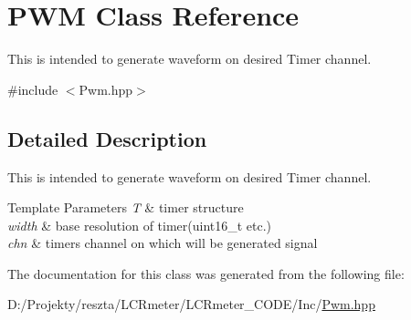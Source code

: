 \hypertarget{class_p_w_m}{}\section{P\+WM Class Reference}
\label{class_p_w_m}


This is intended to generate waveform on desired Timer channel.  




{\ttfamily \#include $<$Pwm.\+hpp$>$}



\subsection{Detailed Description}
This is intended to generate waveform on desired Timer channel. 


\begin{DoxyTemplParams}{Template Parameters}
{\em T} & timer structure \\
\hline
{\em width} & base resolution of timer(uint16\+\_\+t etc.) \\
\hline
{\em chn} & timer\textquotesingle{}s channel on which will be generated signal \\
\hline
\end{DoxyTemplParams}


The documentation for this class was generated from the following file\+:\begin{DoxyCompactItemize}
\item 
D\+:/\+Projekty/reszta/\+L\+C\+Rmeter/\+L\+C\+Rmeter\+\_\+\+C\+O\+D\+E/\+Inc/\mbox{\hyperlink{_pwm_8hpp}{Pwm.\+hpp}}\end{DoxyCompactItemize}
